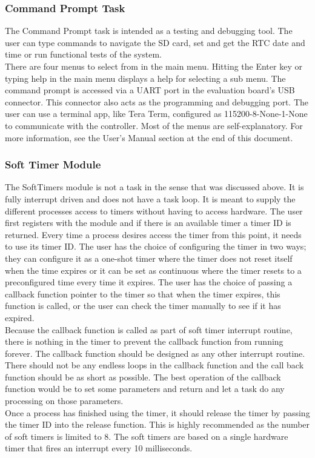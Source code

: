 \documentclass[acmlarge,screen]{acmart}
\begin{document}
\subsubsection{Command Prompt Task}
The Command Prompt task is intended as a testing and debugging tool. The user can type commands to navigate the SD card, set and get the RTC date and time or run functional tests of the system.\\
There are four menus to select from in the main menu. Hitting the Enter key or typing help in the main menu displays a help for selecting a sub menu. The command prompt is accessed via a UART port in the evaluation board's USB connector. This connector also acts as the programming and debugging port. The user can use a terminal app, like Tera Term, configured as 115200-8-None-1-None to communicate with the controller. Most of the menus are self-explanatory. For more information, see the User's Manual section at the end of this document.
\subsubsection{Soft Timer Module}
The SoftTimers module is not a task in the sense that was discussed above. It is fully interrupt driven and does not have a task loop. It is meant to supply the different processes access to timers without having to access hardware. The user first registers with the module and if there is an available timer a timer ID is returned. Every time a process desires access the timer from this point, it needs to use its timer ID. The user has the choice of configuring the timer in two ways; they can configure it as a one-shot timer where the timer does not reset itself when the time expires or it can be set as continuous where the timer resets to a preconfigured time every time it expires. The user has the choice of passing a callback function pointer to the timer so that when the timer expires, this function is called, or the user can check the timer manually to see if it has expired.\\
Because the callback function is called as part of soft timer interrupt routine, there is nothing in the timer to prevent the callback function from running forever. The callback function should be designed as any other interrupt routine. There should not be any endless loops in the callback function and the call back function should be as short as possible. The best operation of the callback function would be to set some parameters and return and let a task do any processing on those parameters.\\
Once a process has finished using the timer, it should release the timer by passing the timer ID into the release function. This is highly recommended as the number of soft timers is limited to 8. The soft timers are based on a single hardware timer that fires an interrupt every 10 milliseconds.
\end{document}
